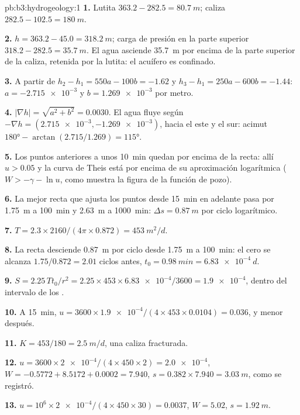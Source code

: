 \begin{solution}{pb:b3:hydrogeology:1}
\textbf{1.} Lutita $363.2 - 282.5 = \qty{80.7}{m}$; caliza $282.5 -
102.5 = \qty{180}{m}$.

\textbf{2.} $h = 363.2 - 45.0 = \qty{318.2}{m}$; carga de presión en la parte superior
$318.2 - 282.5 = \qty{35.7}{m}$. El agua asciende \qty{35.7}{m} por encima de la
parte superior de la caliza, retenida por la lutita: el acuífero es confinado.

\textbf{3.} A partir de $h_2 - h_1 = 550a - 100b = -1.62$ y $h_3 - h_1 = 250a
- 600b = -1.44$: $a = \num{-2.715e-3}$ y $b = \num{1.269e-3}$ por
metro.

\textbf{4.} $|\nabla h| = \sqrt{a^2 + b^2} = \num{0.0030}$. El agua
fluye según $-\nabla h = (\num{2.715e-3}, \num{-1.269e-3})$, hacia el este y
el sur: acimut $\ang{180} - \arctan(2.715/1.269) = \ang{115}$.

\textbf{5.} Los puntos anteriores a unos \qty{10}{min} quedan por encima de la recta: allí
$u > 0.05$ y la curva de Theis está por encima de su aproximación logarítmica
($W > -\gamma - \ln u$, como muestra la figura de la función de pozo).

\textbf{6.} La mejor recta que ajusta los puntos desde \qty{15}{min} en adelante pasa por
\qty{1.75}{m} a \qty{100}{min} y \qty{2.63}{m} a \qty{1000}{min}:
$\Delta s = \qty{0.87}{m}$ por ciclo logarítmico.

\textbf{7.} $T = 2.3\times2160/(4\pi\times0.872) = \qty{453}{m^2/d}$.

\textbf{8.} La recta desciende \qty{0.87}{m} por ciclo desde \qty{1.75}{m} a
\qty{100}{min}: el cero se alcanza $1.75/0.872 = 2.01$ ciclos antes,
$t_0 = \qty{0.98}{min} = \qty{6.83e-4}{d}$.

\textbf{9.} $S = 2.25\,Tt_0/r^2 = 2.25\times453\times\num{6.83e-4}/3600 =
\num{1.9e-4}$, dentro del intervalo de los .

\textbf{10.} A \qty{15}{min}, $u = 3600\times\num{1.9e-4}/(4\times453
\times0.0104) = \num{0.036}$, y menor después.

\textbf{11.} $K = 453/180 = \qty{2.5}{m/d}$, una caliza fracturada.

\textbf{12.} $u = 3600\times\num{2e-4}/(4\times450\times2) =
\num{2.0e-4}$, $W = -0.5772 + 8.5172 + 0.0002 = \num{7.940}$, $s =
0.382\times7.940 = \qty{3.03}{m}$, como se registró.

\textbf{13.} $u = 10^6\times\num{2e-4}/(4\times450\times30) =
\num{0.0037}$, $W = \num{5.02}$, $s = \qty{1.92}{m}$.


\end{solution}
